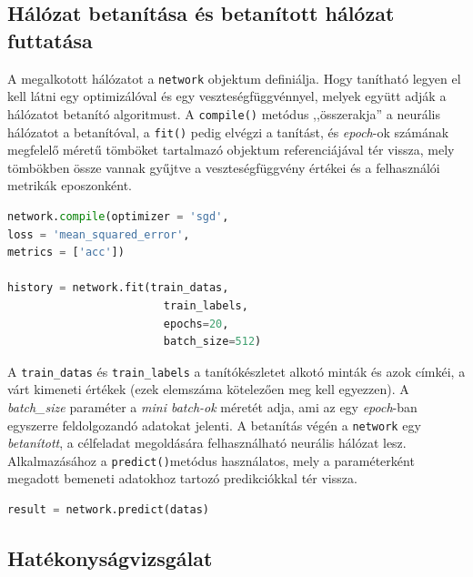 \subsection{Hálózat betanítása és betanított hálózat futtatása}
\label{subsect:inference}
A megalkotott hálózatot a \verb|network| objektum definiálja. Hogy tanítható legyen el kell látni egy optimizálóval és egy veszteségfüggvénnyel, melyek együtt adják a hálózatot betanító algoritmust. A \verb|compile()| metódus ,,összerakja'' a neurális hálózatot a betanítóval, a \verb|fit()| pedig elvégzi a tanítást, és \emph{epoch}-ok számának megfelelő méretű tömböket tartalmazó objektum referenciájával tér vissza, mely tömbökben össze vannak gyűjtve a veszteségfüggvény értékei és a felhasználói metrikák eposzonként. 
\begin{minipage}{\textwidth}
\begin{lstlisting}[language=Python,caption=Hálózat betanítása]
network.compile(optimizer = 'sgd',
loss = 'mean_squared_error',
metrics = ['acc'])

history = network.fit(train_datas,
						train_labels,
						epochs=20,
						batch_size=512)
\end{lstlisting}\label{lst:fitNetwork}
\end{minipage}

A \verb|train_datas| és \verb|train_labels| a tanítókészletet alkotó minták és azok címkéi, a várt kimeneti értékek (ezek elemszáma kötelezően meg kell egyezzen). A \emph{batch\_size} paraméter a \emph{mini batch-ok} méretét adja, ami az egy \emph{epoch}-ban egyszerre feldolgozandó adatokat jelenti. A betanítás végén a \verb|network| egy \emph{betanított}, a célfeladat megoldására felhasználható neurális hálózat lesz. Alkalmazásához a \verb|predict()|metódus használatos, mely a paraméterként megadott bemeneti adatokhoz tartozó predikciókkal tér vissza.
\begin{minipage}{\textwidth}
\begin{lstlisting}[language=Python, caption=Az eszközre töltött hálózat futtatása az adatokon]
	result = network.predict(datas)
\end{lstlisting}
\end{minipage}

\subsection{Hatékonyságvizsgálat}

